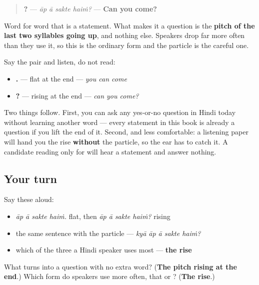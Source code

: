 \begin{sounds}
\begin{quote}
\textbf{   ?} — \emph{āp ā sakte haiṁ?} — \textbf{Can you come?}
\end{quote}

Word for word that is a statement. What makes it a question is the \textbf{pitch of the last two syllables going up}, and nothing else. Speakers drop \textbf{} far more often than they use it, so this is the ordinary form and the particle is the careful one.

Say the pair and listen, do not read:

\begin{itemize}
\raggedright
  \item \textbf{   .} — flat at the end — \emph{you can come}
  \item \textbf{   ?} — rising at the end — \emph{can you come?}
\end{itemize}

Two things follow. First, you can ask any yes-or-no question in Hindi today without learning another word — every statement in this book is already a question if you lift the end of it. Second, and less comfortable: a listening paper will hand you the rise \textbf{without} the particle, so the ear has to catch it. A candidate reading only for \textbf{} will hear a statement and answer nothing.
\end{sounds}

\subsection*{Your turn}
Say these aloud:

\begin{itemize}
\raggedright
  \item \emph{āp ā sakte haiṁ.} flat, then \emph{āp ā sakte haiṁ?} rising
  \item the same sentence with the particle — \emph{kyā āp ā sakte haiṁ?}
  \item which of the three a Hindi speaker uses most — \textbf{the rise}
\end{itemize}

\begin{tcolorbox}[breakable,colback=teal!4,colframe=teal!35!black,title={Before you move on}]
What turns \textbf{   } into a question with no extra word? (\textbf{The pitch rising at the end}.) Which form do speakers use more often, that or \textbf{}? (\textbf{The rise}.)
\end{tcolorbox}
